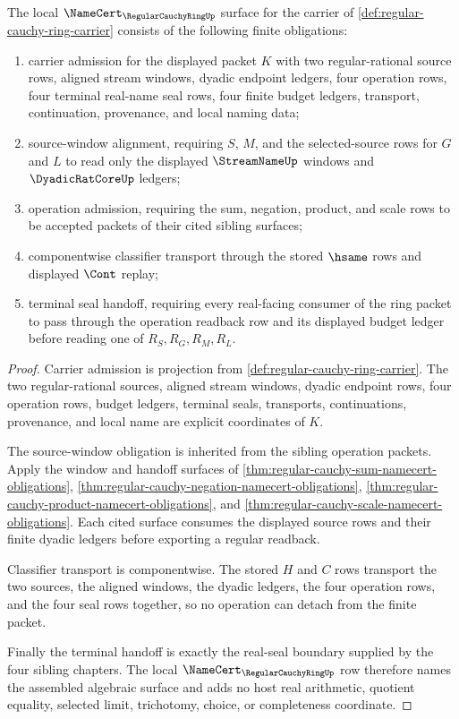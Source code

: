 \begin{theorem}
\label{thm:regular-cauchy-ring-namecert-obligations}
The local $\NameCert_{\RegularCauchyRingUp}$ surface for the carrier of \autoref{def:regular-cauchy-ring-carrier} consists of the following finite obligations:
\begin{enumerate}
\item carrier admission for the displayed packet $K$ with two regular-rational source rows, aligned stream windows, dyadic endpoint ledgers, four operation rows, four terminal real-name seal rows, four finite budget ledgers, transport, continuation, provenance, and local naming data;
\item source-window alignment, requiring $S$, $M$, and the selected-source rows for $G$ and $L$ to read only the displayed $\StreamNameUp$ windows and $\DyadicRatCoreUp$ ledgers;
\item operation admission, requiring the sum, negation, product, and scale rows to be accepted packets of their cited sibling surfaces;
\item componentwise classifier transport through the stored $\hsame$ rows and displayed $\Cont$ replay;
\item terminal seal handoff, requiring every real-facing consumer of the ring packet to pass through the operation readback row and its displayed budget ledger before reading one of $R_S,R_G,R_M,R_L$.
\end{enumerate}
\end{theorem}
\begin{proof}
Carrier admission is projection from \autoref{def:regular-cauchy-ring-carrier}. The two regular-rational sources, aligned stream windows, dyadic endpoint rows, four operation rows, budget ledgers, terminal seals, transports, continuations, provenance, and local name are explicit coordinates of $K$.

The source-window obligation is inherited from the sibling operation packets. Apply the window and handoff surfaces of \autoref{thm:regular-cauchy-sum-namecert-obligations}, \autoref{thm:regular-cauchy-negation-namecert-obligations}, \autoref{thm:regular-cauchy-product-namecert-obligations}, and \autoref{thm:regular-cauchy-scale-namecert-obligations}. Each cited surface consumes the displayed source rows and their finite dyadic ledgers before exporting a regular readback.

Classifier transport is componentwise. The stored $H$ and $C$ rows transport the two sources, the aligned windows, the dyadic ledgers, the four operation rows, and the four seal rows together, so no operation can detach from the finite packet.

Finally the terminal handoff is exactly the real-seal boundary supplied by the four sibling chapters. The local $\NameCert_{\RegularCauchyRingUp}$ row therefore names the assembled algebraic surface and adds no host real arithmetic, quotient equality, selected limit, trichotomy, choice, or completeness coordinate.
\end{proof}

